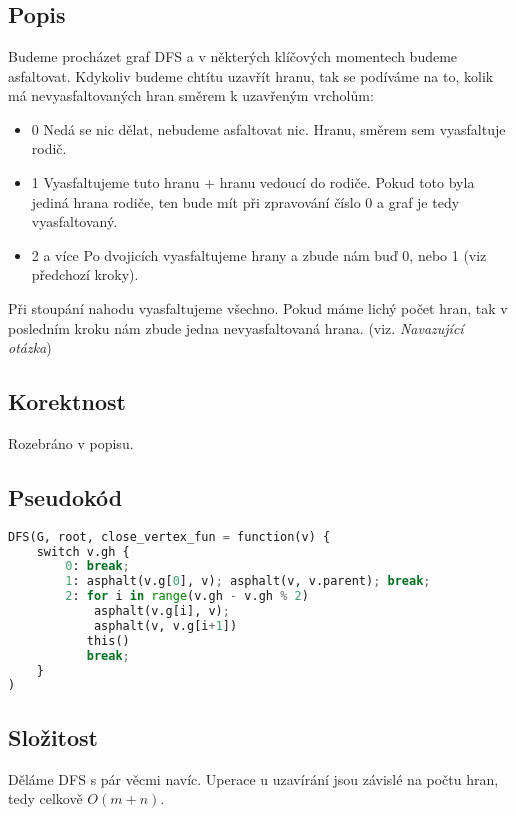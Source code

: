 \documentclass[a4paper]{article}
\begin{document}
\text{}\vspace{-0.1cm}
{\fontsize{12}{15}\selectfont \hspace{-0.5cm}}

\section{}
\subsection{Popis}
Budeme procházet graf DFS a v některých klíčových momentech budeme asfaltovat. Kdykoliv budeme chtítu uzavřít hranu, tak se podíváme na to, kolik má nevyasfaltovaných hran směrem k uzavřeným vrcholům:
\begin{itemize}
	\item{0} Nedá se nic dělat, nebudeme asfaltovat nic. Hranu, směrem sem vyasfaltuje rodič.
	\item{1} Vyasfaltujeme tuto hranu + hranu vedoucí do rodiče. Pokud toto byla jediná hrana rodiče, ten bude mít při zpravování číslo 0 a graf je tedy vyasfaltovaný.
	\item{2 a více} Po dvojicích vyasfaltujeme hrany a zbude nám buď 0, nebo 1 (viz předchozí kroky). 
\end{itemize}
Při stoupání nahodu vyasfaltujeme všechno. Pokud máme lichý počet hran, tak v posledním kroku nám zbude jedna nevyasfaltovaná hrana. (viz. \textit{Navazující otázka})

\subsection{Korektnost}
Rozebráno v popisu.

\subsection{Pseudokód}
\begin{lstlisting}[language=Python]
DFS(G, root, close_vertex_fun = function(v) {
	switch v.gh {
		0: break;
		1: asphalt(v.g[0], v); asphalt(v, v.parent); break;
		2: for i in range(v.gh - v.gh % 2)
			asphalt(v.g[i], v);
			asphalt(v, v.g[i+1])
		   this()
		   break;
	}
)
\end{lstlisting}

\subsection{Složitost}
Děláme DFS s pár věcmi navíc. Uperace u uzavírání jsou závislé na počtu hran, tedy celkově $O(m+n)$.
\end{document}
